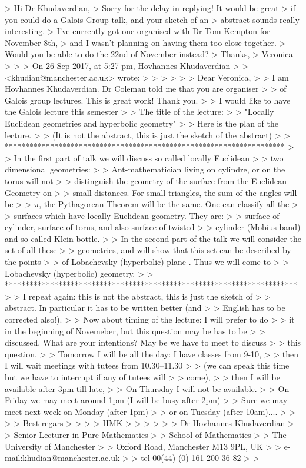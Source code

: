 >  Hi Dr Khudaverdian,
>  Sorry for the delay in replying! It would be great
> if you could do a Galois Group talk, and your sketch of an
> abstract sounds really interesting.
> I’ve currently got one organised with Dr Tom Kempton for November 8th,
> and I wasn’t planning on having them too close together.
> Would you be able to do the 22nd of November instead?
>  Thanks,
>  Veronica
> 
> >  On 26 Sep 2017, at 5:27 pm, Hovhannes Khudaverdian 
> >  <khudian@manchester.ac.uk> wrote:
> > 
> > 
> >                Dear Veronica,
> >     I am Hovhannes Khudaverdian. Dr Coleman told me that you are organiser 
> >     of Galois group  lectures.  This is great work!  Thank you.
> >     I would like to have the Galois lecture this semester
> >     The title of the lecture:
> >     "Locally Euclidean geometries and hyperbolic geometry"
> >     Here is the plan of the lecture.
> >  (It is not the abstract, this is just the sketch of the abstract)
> >  ********************************************************************
> >    In the first part of talk we will discuss so called locally Euclidean
> >  two dimensional geometries:
> >  Ant-mathematician  living on cylindre, or on the torus will not 
> >  distinguish the geometry of the surface from the Euclidean Geometry on 
> >  small distances. For small triangles, the sum of the angles will be
> >  $\pi$, the Pythagorean Theorem will be the same. One can classify all the 
> >  surfaces  which have locally Euclidean geometry. They are:
> >  surface of cylinder, surface of torus, and also surface of twisted 
> >  cylinder (Mobius band) and so called Klein bottle.
> >    In the second part of the talk we will consider the set of all these
> >  geometries, and will show that this set can be described by the points
> >  of Lobachevsky (hyperbolic) plane . Thus we will come to
> >  Lobachevsky (hyperbolic) geometry.
> >  ***********************************************************************
> >    I repeat again: this is not the abstract, this is just the sketch of 
> >  abstract. In particular it has to be written better (and
> >  English has to be corrected also!).
> >    Now  about timing of the lecture: I will prefer to do
> >  it in the beginning of Novemeber, but this question may be has to be 
> >  discussed.  What are your intentions? May be we have to  meet to discuss 
> >  this question.
> >     Tomorrow I will be all the day: I have classes from 9-10,
> >  then  I will wait meetings with tutees from 10.30--11.30
> >  (we can speak this time but we have to interrupt if any of tutees will 
> >  come),
> >  then I will be available after 3pm  till late,
> >     On Thursday I will not be available.
> >     On Friday we may meet around 1pm (I will be busy after 2pm)
> >     Sure we may meet next week on Monday (after 1pm)
> >  or on Tuesday (after 10am)....
> > 
> >                    Best regars
> > 
> >                                   HMK
> > 
> > 
> >                             Dr Hovhannes Khudaverdian
> >                         Senior Lecturer in Pure Mathematics
> >                              School of Mathematics
> >                           The University of Manchester
> >                       Oxford Road, Manchester  M13 9PL, UK
> >                         e-mail:khudian@manchester.ac.uk
> >                          tel 00(44)-(0)-161-200-36-82
> 
>
